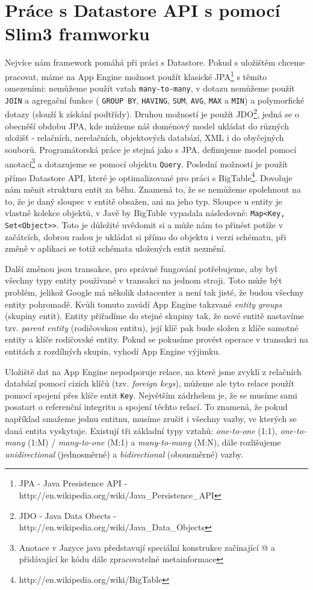\section{Práce s Datastore API s pomocí Slim3 framworku}
Nejvíce nám framework pomáhá při práci s Datastore. Pokud s uložištěm chceme pracovat, máme na App Engine možnost použít klasické JPA\footnote{JPA - Java Presistence API - http://en.wikipedia.org/wiki/Java\_Persistence\_API} s těmito omezeními: nemůžeme použít vztah \verb|many-to-many|, v dotazu nemůžeme použít \verb|JOIN| a agregační funkce ( \verb|GROUP BY|,  \verb|HAVING|,  \verb|SUM|,  \verb|AVG|,  \verb|MAX| a  \verb|MIN|) a polymorfické dotazy (slouží k získání podtřídy). Druhou možností je použít JDO\footnote{JDO - Java Data Obects - http://en.wikipedia.org/wiki/Java\_Data\_Objects}, jedná se o obecněší obdobu JPA, kde můžeme náš doménový model ukládat do různých uložišť - relačních, nerelačních, objektových databází,  XML i do obyčejných souborů. Programátorská práce je stejná jako s JPA, definujeme model pomocí anotací\footnote{Anotace v Jazyce java představují speciální konstrukce začínající @ a přidávající ke kódu dále zpracovatelné metainformace} a dotazujeme se pomocí objektu \verb|Query|. Poslední možností je použít přímo Datastore API, které je optimalizované pro práci s BigTable\footnote{http://en.wikipedia.org/wiki/BigTable}. Dovoluje nám měnit strukturu entit za běhu. Znamená to, že se nemůžeme spolehnout na to, že je daný sloupec v entitě obsažen, ani na jeho typ. Sloupce u entity je vlastně kolekce objektů, v Javě by BigTable vypadala následovně: \verb|Map<Key, Set<Object>>|. Toto je důležité uvědomit si a může nám to přinést potíže v začátcích, dobrou radou je ukládat si přímo do objektu i verzi schématu, při změně v aplikaci se totiž schémata uložených entit nezmění. 

Další změnou jsou transakce, pro správné fungování potřebujeme, aby byl všechny typy entity používané v transakci na jednom stroji. Toto může být problém, jelikož Google má několik datacenter a není tak jisté, že budou všechny entity pohromadě. Kvůli tomuto zavádí App Engine takzvané \emph{entity groups} (skupiny entit). Entity přiřadíme do stejné skupiny tak, že nové entitě nastavíme tzv. \emph{parent entity} (rodičovskou entitu), její klíč pak bude složen z klíče samotné entity a klíče rodičovské entity. Pokud se pokusíme provést operace v transakci na entitách z rozdílných skupin, vyhodí App Engine výjimku.

Uložiště dat na App Engine nepodporuje relace, na které jsme zvyklí z relačních databází pomocí cizích klíčů (tzv. \emph{foreign keys}), můžeme ale tyto relace použít pomocí spojení přes klíče entit \verb|Key|. Největším zádrhelem je, že se musíme sami posatart o referenční integritu a spojení těchto relací. To znamená, že pokud například smažeme jednu entitnu, musíme zrušit i všechny vazby, ve kterých se daná entita vyskytuje. Existují tři základní typy vztahů: \emph{one-to-one} (1:1), \emph{one-to-many} (1:M) / \emph{many-to-one} (M:1) a \emph{many-to-many} (M:N), dále rozlišujeme \emph{unidirectional} (jednosměrné) a \emph{bidirectional} (obousměrné) vazby. 

